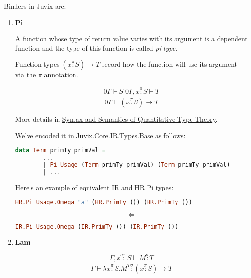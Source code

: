 \documentclass[acmsmall]{acmart}
\numberwithin{figure}{subsection}
\begin{document}
Binders in Juvix are:
\begin{enumerate}
    \item \textbf{Pi}

    A function whose type of return value varies with its argument is a dependent function and the type of this function is called \textit{pi-type}.
    
    Function types $(x \stackrel{\pi}{:} S) \rightarrow T$ record how the function will use its argument via the $\pi$ annotation.

    \begin{equation*}
       \dfrac{0\Gamma \vdash S \; 0 \Gamma, x \stackrel{0}{:} S \vdash T }{0 \Gamma \vdash (x \stackrel{\pi}{:} S) \rightarrow T} 
    \end{equation*}

    More details in \href{https://bentnib.org/quantitative-type-theory.pdf}{Syntax and Semantics of Quantitative Type Theory}.

    \bigskip

    We've encoded it in Juvix.Core.IR.Types.Base as follows:
    \begin{lstlisting}[language=haskell]
data Term primTy primVal = 
        ...
        | Pi Usage (Term primTy primVal) (Term primTy primVal)
        | ...
    \end{lstlisting}

    Here's an example of equivalent IR and HR Pi types:

    \begin{lstlisting}[language=haskell]
        HR.Pi Usage.Omega "a" (HR.PrimTy ()) (HR.PrimTy ())
    \end{lstlisting}
    \begin{equation*}
      \Leftrightarrow  
    \end{equation*}
    \begin{lstlisting}[language=haskell]
        IR.Pi Usage.Omega (IR.PrimTy ()) (IR.PrimTy ())
    \end{lstlisting}
    \item \textbf{Lam}

    \begin{equation*}
       \dfrac{\Gamma, x \stackrel{\sigma \pi}{:} S \vdash M \stackrel{\sigma}{:} T }{\Gamma \vdash \lambda x \stackrel{\pi}{:} S .M^T \stackrel{\sigma}{:} (x \stackrel{\pi}{:} S) \rightarrow T} 
    \end{equation*}


\end{enumerate}
\end{document}
